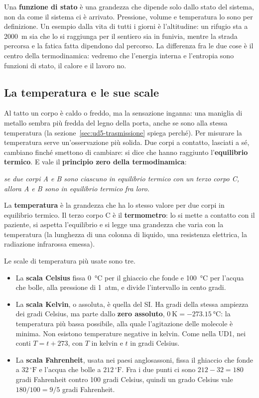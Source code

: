 Una \textbf{funzione di stato} è una grandezza che dipende solo dallo stato del sistema, non da come il sistema ci è arrivato. Pressione, volume e temperatura lo sono per definizione. Un esempio dalla vita di tutti i giorni è l'altitudine: un rifugio sta a \SI{2000}{\metre} sia che lo si raggiunga per il sentiero sia in funivia, mentre la strada percorsa e la fatica fatta dipendono dal percorso. La differenza fra le due cose è il centro della termodinamica: vedremo che l'energia interna e l'entropia sono funzioni di stato, il calore e il lavoro no.

\subsection{La temperatura e le sue scale}

Al tatto un corpo è caldo o freddo, ma la sensazione inganna: una maniglia di metallo sembra più fredda del legno della porta, anche se sono alla stessa temperatura (la sezione~\ref{sec:ud5-trasmissione} spiega perché). Per misurare la temperatura serve un'osservazione più solida. Due corpi a contatto, lasciati a sé, cambiano finché smettono di cambiare: si dice che hanno raggiunto l'\textbf{equilibrio termico}. E vale il \textbf{principio zero della termodinamica}:

\emph{se due corpi A e B sono ciascuno in equilibrio termico con un terzo corpo C, allora A e B sono in equilibrio termico fra loro.}

La \textbf{temperatura} è la grandezza che ha lo stesso valore per due corpi in equilibrio termico. Il terzo corpo C è il \textbf{termometro}: lo si mette a contatto con il paziente, si aspetta l'equilibrio e si legge una grandezza che varia con la temperatura (la lunghezza di una colonna di liquido, una resistenza elettrica, la radiazione infrarossa emessa).

Le scale di temperatura più usate sono tre.
\begin{itemize}
  \item La \textbf{scala Celsius} fissa \SI{0}{\celsius} per il ghiaccio che fonde e \SI{100}{\celsius} per l'acqua che bolle, alla pressione di \SI{1}{atm}, e divide l'intervallo in cento gradi.
  \item La \textbf{scala Kelvin}, o assoluta, è quella del SI. Ha gradi della stessa ampiezza dei gradi Celsius, ma parte dallo \textbf{zero assoluto}, $\SI{0}{\kelvin} = \SI{-273,15}{\celsius}$: la temperatura più bassa possibile, alla quale l'agitazione delle molecole è minima. Non esistono temperature negative in kelvin. Come nella UD1, nei conti $T = t + 273$, con $T$ in kelvin e $t$ in gradi Celsius.
  \item La \textbf{scala Fahrenheit}, usata nei paesi anglosassoni, fissa il ghiaccio che fonde a $32\,^{\circ}\mathrm{F}$ e l'acqua che bolle a $212\,^{\circ}\mathrm{F}$. Fra i due punti ci sono $212 - 32 = 180$ gradi Fahrenheit contro 100 gradi Celsius, quindi un grado Celsius vale $180/100 = 9/5$ gradi Fahrenheit.
\end{itemize}

